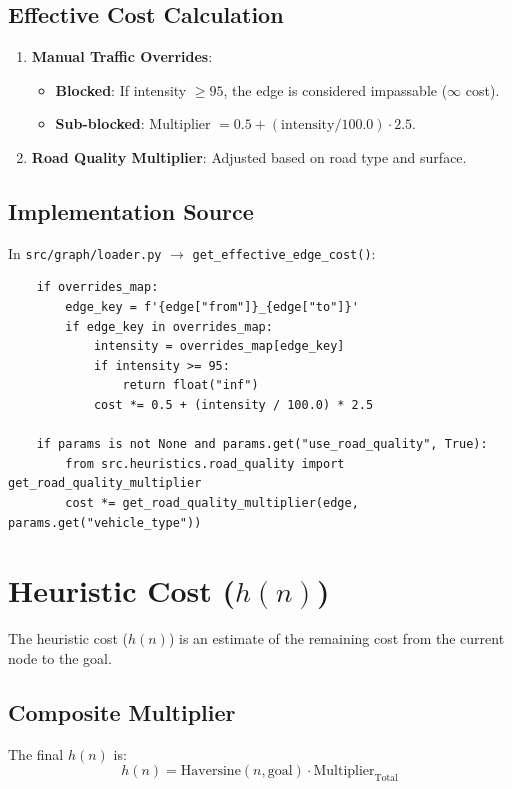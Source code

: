 \documentclass[11pt,a4paper]{article}
\begin{document}
\subsection{Effective Cost Calculation}
\begin{enumerate}
    \item \textbf{Manual Traffic Overrides}:
    \begin{itemize}
        \item \textbf{Blocked}: If intensity $\ge 95$, the edge is considered impassable ($\infty$ cost).
        \item \textbf{Sub-blocked}: Multiplier $= 0.5 + (\text{intensity}/100.0) \cdot 2.5$.
    \end{itemize}
    \item \textbf{Road Quality Multiplier}:
    Adjusted based on road type and surface.
\end{enumerate}

\subsection{Implementation Source}
In \texttt{src/graph/loader.py} $\rightarrow$ \texttt{get\_effective\_edge\_cost()}:
\begin{lstlisting}
    if overrides_map:
        edge_key = f'{edge["from"]}_{edge["to"]}'
        if edge_key in overrides_map:
            intensity = overrides_map[edge_key]
            if intensity >= 95:
                return float("inf")
            cost *= 0.5 + (intensity / 100.0) * 2.5

    if params is not None and params.get("use_road_quality", True):
        from src.heuristics.road_quality import get_road_quality_multiplier
        cost *= get_road_quality_multiplier(edge, params.get("vehicle_type"))
\end{lstlisting}

\section{Heuristic Cost ($h(n)$)}

The heuristic cost ($h(n)$) is an estimate of the remaining cost from the current node to the goal.

\subsection{Composite Multiplier}
The final $h(n)$ is:
\[ h(n) = \text{Haversine}(n, \text{goal}) \cdot \text{Multiplier}_{\text{Total}} \]
\end{document}
